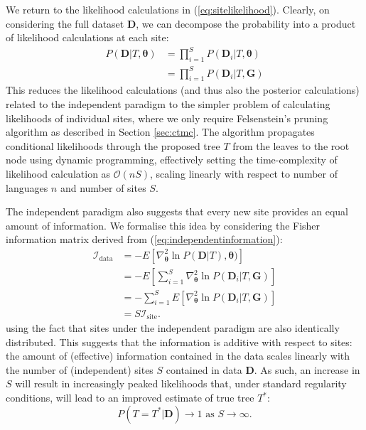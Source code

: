 We return to the likelihood calculations in (\ref{eq:sitelikelihood}). Clearly, on considering the full dataset $\mathbf{D}$, we can decompose the probability into a product of likelihood calculations at each site:
\begin{align}
    P(\mathbf{D} | T, \boldsymbol{\theta}) &= \prod_{i=1}^S P(\mathbf{D}_i | T, \boldsymbol{\theta}) \\
    &= \prod_{i=1}^S P(\mathbf{D}_i | T, \mathbf{G}) \label{eq:independentbreakdown}
\end{align}
This reduces the likelihood calculations (and thus also the posterior calculations) related to the independent paradigm to the simpler problem of calculating likelihoods of individual sites, where we only require Felsenstein's pruning algorithm as described in Section \ref{sec:ctmc}. The algorithm propagates conditional likelihoods through the proposed tree $T$ from the leaves to the root node using dynamic programming, effectively setting the time-complexity of likelihood calculation as $\mathcal{O}(nS)$, scaling linearly with respect to number of languages $n$ and number of sites $S$.  

The independent paradigm also suggests that every new site provides an equal amount of information. We formalise this idea by considering the Fisher information matrix derived from (\ref{eq:independentinformation}):
\begin{align}
    \mathcal{I}_{\text{data}} &= -E\left[\nabla^2_{\boldsymbol{\theta}} \ln P(\mathbf{D}|T), \boldsymbol{\theta})\right] \\
    &= -E\left[\sum_{i=1}^S\nabla^2_{\boldsymbol{\theta}} \ln P(\mathbf{D}_i|T, \mathbf{G})\right] \\
    &= -\sum_{i=1}^SE\left[\nabla^2_{\boldsymbol{\theta}} \ln P(\mathbf{D}_i|T, \mathbf{G})\right] \\
    &= S \mathcal{I}_{\text{site}}. \label{eq:independentinformation}
\end{align}
using the fact that sites under the independent paradigm are also identically distributed. This suggests that the information is additive with respect to sites: the amount of (effective) information contained in the data scales linearly with the number of (independent) sites $S$ contained in data $\mathbf{D}$. As such, an increase in $S$ will result in increasingly peaked likelihoods that, under standard regularity conditions, will lead to an improved estimate of true tree $T^*$:
\begin{equation}
    P(T=T^*|\mathbf{D}) \to 1 \text{ as } S \to \infty.
\end{equation}

